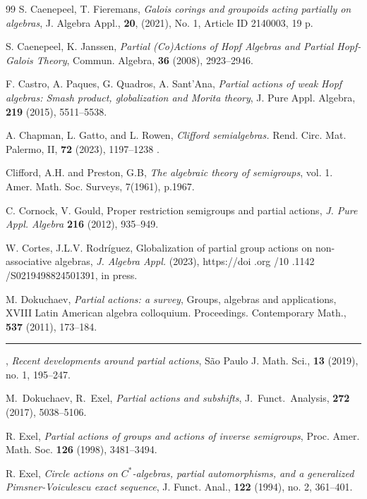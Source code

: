 \documentclass{amsart}
\newcommand{\0}{{\vartheta}}
\theoremstyle{definition}
\theoremstyle{remark}
\numberwithin{equation}{section}
\newtheorem*{Theorem A}{\textbf{Theorem A}}
\newtheorem*{Corollary E}{\textbf{Corollary E}}
\newtheorem*{Corollary F}{\textbf{Corollary F}}
\newtheorem*{Theorem B}{\textbf{Theorem B}}
\newtheorem*{Theorem C}{\textbf{Theorem C}}
\newtheorem*{Theorem D}{\textbf{Theorem B}}
\newtheorem*{p a}{\textbf{Proof of  Theorem A}}
\newtheorem*{p b}{\textbf{Proof of Theorem B}}
\newtheorem*{p c}{\textbf{Proof of  Theorem C}}
\newtheorem*{p d}{\textbf{Proof of  Theorem D}}
\begin{document}
\begin{thebibliography}{99}
 S. Caenepeel, T. Fieremans, 
{\em Galois corings and groupoids acting partially on algebras},
 J. Algebra Appl., {\bf 20}, (2021),  No. 1, Article ID 2140003, 19 p.

 S. Caenepeel, K. Janssen, {\em Partial (Co)Actions of
Hopf Algebras and Partial Hopf-Galois Theory},  Commun.  Algebra, {\bf 36} (2008), 2923--2946.

 F. Castro, A. Paques, G. Quadros, A. Sant'Ana,  {\em Partial actions of weak Hopf algebras: Smash product, 
globalization and Morita theory},   J. Pure Appl. Algebra, {\bf 219}   (2015), 5511--5538.

 A. Chapman, L. Gatto, and L. Rowen, {\em Clifford semialgebras.} Rend. Circ. Mat. Palermo, II, {\bf 72} (2023), 1197--1238 .

Clifford, A.H. and Preston, G.B, {\em The algebraic theory of semigroups}, vol. 1. Amer. Math. Soc. Surveys, 7(1961), p.1967.

 C. Cornock, V. Gould, Proper restriction semigroups and partial actions, 
{\it J. Pure Appl. Algebra} {\bf 216} (2012), 935--949.



 W. Cortes, J.L.V. Rodríguez, Globalization of partial group actions on non-associative algebras, {\em J. Algebra Appl.} (2023), https://doi .org /10 .1142 /S0219498824501391, in press.

 M. Dokuchaev, {\em Partial actions: a survey}, Groups,  algebras and applications, XVIII Latin American algebra colloquium.  Proceedings.  Contemporary Math., {\bf 537}  (2011),  173--184.

\rule{11mm}{0.1mm}, {\em Recent developments around partial actions}, São Paulo J. Math. Sci., {\bf 13} (2019), no. 1, 195--247. 

 M.\ Dokuchaev, R.\ Exel, {\em Partial actions and subshifts},   J.~Funct.~Analysis, {\bf 272}  
(2017), 5038--5106.


 R. Exel, {\em Partial actions of groups and actions of inverse semigroups},  Proc. Amer.
Math. Soc. {\bf 126} (1998), 3481--3494.

 R. Exel, {\em Circle actions on $C^*$-algebras, partial automorphisms, and a generalized Pimsner-Voiculescu exact sequence}, J. Funct. Anal., {\bf 122} (1994), no. 2, 361--401.





\end{thebibliography}
\end{document}
